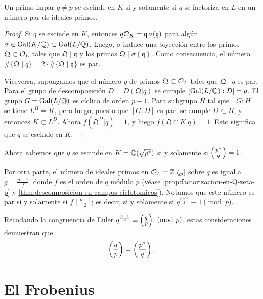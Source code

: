 \begin{lema}
  Un primo impar $q \ne p$ se escinde en $K$ si y solamente si
  $q$ se factoriza en $L$ en un número par de ideales primos.

  \begin{proof}
    Si $q$ se escinde en $K$, entonces
    $q\mathcal{O}_K = \mathfrak{q} \, \sigma (\mathfrak{q})$ para algún
    $\sigma \in \operatorname{Gal} (K/\mathbb{Q}) \subset \operatorname{Gal} (L/\mathbb{Q})$. Luego, $\sigma$ induce una
    biyección entre los primos $\mathfrak{Q} \subset \mathcal{O}_L$ tales que
    $\mathfrak{Q} \mid \mathfrak{q}$ y los primos
    $\mathfrak{Q} \mid \sigma (\mathfrak{q})$. Como consecuencia, el número
    $\# \{ \mathfrak{Q} \mid q \} = 2\cdot \# \{ \mathfrak{Q} \mid \mathfrak{q} \}$
    es par.

    Viceversa, supongamos que el número $g$ de primos
    $\mathfrak{Q} \subset \mathcal{O}_L$ tales que $\mathfrak{Q} \mid q$ es par.
    Para el grupo de descomposición $D = D (\mathfrak{Q}|q)$ se cumple
    $[\operatorname{Gal} (L/\mathbb{Q}) : D] = g$. El grupo $G = \operatorname{Gal} (L/\mathbb{Q})$ es cíclico de orden
    $p-1$. Para subgrupo $H$ tal que $[G : H]$ se tiene $L^H = K$, pero luego,
    puesto que $[G : D]$ es par, se cumple $D \subset H$, y entonces
    $K \subset L^D$. Ahora $f (\mathfrak{Q}^D|q) = 1$, y luego
    $f (\mathfrak{Q}\cap K|q) = 1$. Esto significa que $q$ se
    escinde en $K$.
  \end{proof}
\end{lema}

Ahora sabemos que $q$ se escinde en $K = \mathbb{Q} (\sqrt{p^*})$ si y solamente si
$\left(\frac{p^*}{q}\right) = 1$.

Por otra parte, el número de ideales primos en $\mathcal{O}_L = \mathbb{Z} [\zeta_p]$ sobre $q$
es igual a $g = \frac{p-1}{f}$, donde $f$ es el orden de $q$ módulo $p$
(véase \ref{prop:factorizacion-en-Q-zeta-p} y
\ref{thm:descomposicion-en-campos-ciclotomicos}). Notamos que este número es
par si y solamente si $f \mid \frac{p-1}{2}$; es decir, si y solamente si
$q^{\frac{p-1}{2}} \equiv 1 \pmod{p}$.

Recodando la congruencia de Euler
$q^{\frac{p-1}{2}} \equiv \left(\frac{q}{p}\right) \pmod{p}$, estas consideraciones
demuestran que
$$\left(\frac{q}{p}\right) = \left(\frac{p^*}{q}\right).$$


\section{El Frobenius}
\label{sec:frobenius}

